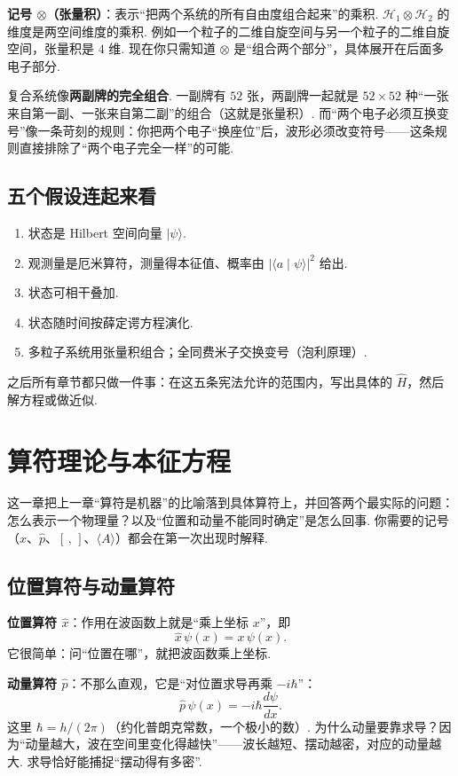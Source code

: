\documentclass[UTF8,11pt,a4paper,openany]{ctexbook}
\newcommand{\ket}[1]{\lvert #1\rangle}\newcommand{\bra}[1]{\langle #1\rvert}
\newcommand{\braket}[2]{\langle #1\mid #2\rangle}\newcommand{\ii}{\mathrm i}
\begin{document}
\begin{notationbox}
\textbf{记号 $\otimes$（张量积）}：表示“把两个系统的所有自由度组合起来”的乘积. $\mathcal H_1\otimes\mathcal H_2$ 的维度是两空间维度的乘积. 例如一个粒子的二维自旋空间与另一个粒子的二维自旋空间，张量积是 $4$ 维. 现在你只需知道 $\otimes$ 是“组合两个部分”，具体展开在后面多电子部分. 
\end{notationbox}

\begin{analogybox}
复合系统像\textbf{两副牌的完全组合}. 一副牌有 $52$ 张，两副牌一起就是 $52\times52$ 种“一张来自第一副、一张来自第二副”的组合（这就是张量积）. 而“两个电子必须互换变号”像一条苛刻的规则：你把两个电子“换座位”后，波形必须改变符号——这条规则直接排除了“两个电子完全一样”的可能. 
\end{analogybox}

\section{五个假设连起来看}
\begin{enumerate}
\item 状态是 Hilbert 空间向量 $\ket\psi$. 
\item 观测量是厄米算符，测量得本征值、概率由 $|\braket a\psi|^2$ 给出. 
\item 状态可相干叠加. 
\item 状态随时间按薛定谔方程演化. 
\item 多粒子系统用张量积组合；全同费米子交换变号（泡利原理）. 
\end{enumerate}
之后所有章节都只做一件事：在这五条宪法允许的范围内，写出具体的 $\hat H$，然后解方程或做近似. 

\chapter{算符理论与本征方程}
这一章把上一章“算符是机器”的比喻落到具体算符上，并回答两个最实际的问题：怎么表示一个物理量？以及“位置和动量不能同时确定”是怎么回事. 你需要的记号（$\hat x$、$\hat p$、$[\,,\,]$、$\langle A\rangle$）都会在第一次出现时解释. 

\section{位置算符与动量算符}
\textbf{位置算符 $\hat x$}：作用在波函数上就是“乘上坐标 $x$”，即
\[
\hat x\,\psi(x)=x\,\psi(x).
\]
它很简单：问“位置在哪”，就把波函数乘上坐标. 

\textbf{动量算符 $\hat p$}：不那么直观，它是“对位置求导再乘 $-i\hbar$”：
\[
\hat p\,\psi(x)=-i\hbar\frac{d\psi}{dx}.
\]
这里 $\hbar=h/(2\pi)$（约化普朗克常数，一个极小的数）. 为什么动量要靠求导？因为“动量越大，波在空间里变化得越快”——波长越短、摆动越密，对应的动量越大. 求导恰好能捕捉“摆动得有多密”. 
\end{document}
